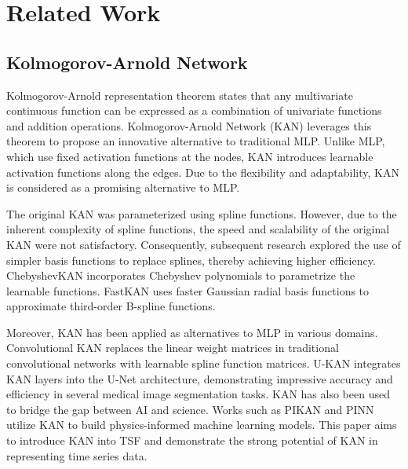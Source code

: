 \section{Related Work}
\subsection{Kolmogorov-Arnold Network}
Kolmogorov-Arnold representation theorem states that any multivariate continuous function can be expressed as a combination of univariate functions and addition operations. Kolmogorov-Arnold Network (KAN) \citep{liu2024kan} leverages this theorem to propose an innovative alternative to traditional MLP. Unlike MLP, which use fixed activation functions at the nodes, KAN introduces learnable activation functions along the edges. Due to the flexibility and adaptability, KAN is considered as a promising alternative to MLP.\par
The original KAN was parameterized using spline functions. However, due to the inherent complexity of spline functions, the speed and scalability of the original KAN were not satisfactory. Consequently, subsequent research explored the use of simpler basis functions to replace splines, thereby achieving higher efficiency. ChebyshevKAN \citep{ss2024chebyshev} incorporates Chebyshev polynomials to parametrize the learnable functions. FastKAN \citep{li2024kolmogorov} uses faster Gaussian radial basis functions to approximate third-order B-spline functions.\par 
Moreover, KAN has been applied as alternatives to MLP in various domains. Convolutional KAN \citep{bodner2024convolutional} replaces the linear weight matrices in traditional convolutional networks with learnable spline function matrices. U-KAN \citep{li2024ukan} integrates KAN layers into the U-Net architecture, demonstrating impressive accuracy and efficiency in several medical image segmentation tasks. KAN has also been used to bridge the gap between AI and science. Works such as PIKAN \citep{shukla2024pikan} and PINN \citep{wang2024kinn} utilize KAN to build physics-informed machine learning models. This paper aims to introduce KAN into TSF and demonstrate the strong potential of KAN in representing time series data.

